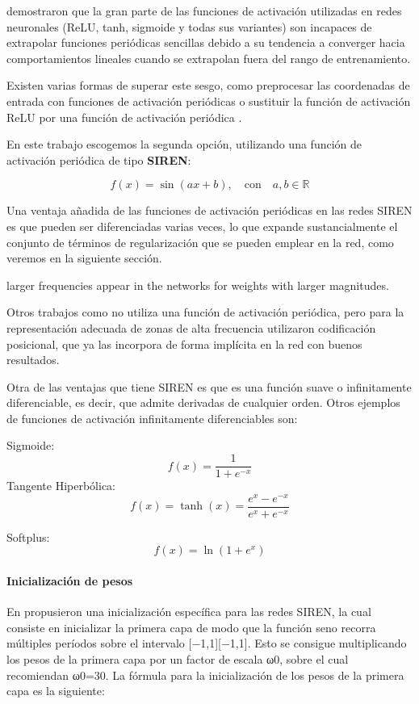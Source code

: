 \cite{ziyin2020neuralnetworksfaillearn} demostraron que la gran parte de las funciones de activación utilizadas en redes neuronales (ReLU, tanh, sigmoide y todas sus variantes)
son incapaces de extrapolar funciones periódicas sencillas debido a su tendencia a converger hacia comportamientos lineales cuando se extrapolan fuera del rango de entrenamiento.

Existen varias formas de superar este sesgo, como preprocesar las coordenadas de entrada con funciones de activación periódicas \cite{mildenhall2020nerfrepresentingscenesneural}
o sustituir la función de activación ReLU por una función de activación periódica \cite{sitzmann2020implicitneuralrepresentationsperiodic}.

En este trabajo escogemos la segunda opción, utilizando una función de activación periódica de tipo \textbf{SIREN}:

\[
f(x) = \sin(ax + b), \quad \text{con} \quad a, b \in \mathbb{R}
\]

Una ventaja añadida de las funciones de activación periódicas en las redes SIREN es que pueden ser diferenciadas varias veces,
lo que expande sustancialmente el conjunto de términos de regularización que se pueden emplear en la red, como veremos en la siguiente sección.

larger frequencies appear in the networks for weights with larger magnitudes.

Otros trabajos como \cite{mildenhall2020nerfrepresentingscenesneural} no utiliza una función de activación periódica, pero para la representación adecuada de zonas de alta frecuencia
utilizaron codificación posicional, que ya las incorpora de forma implícita en la red con buenos resultados.

Otra de las ventajas que tiene SIREN es que es una función suave o infinitamente diferenciable, es decir, que admite derivadas de cualquier orden.
Otros ejemplos de funciones de activación infinitamente diferenciables son:

Sigmoide:
\[
f(x) = \frac{1}{1 + e^{-x}}
\]
Tangente Hiperbólica:
\[
f(x) = \tanh(x) = \frac{e^x - e^{-x}}{e^x + e^{-x}}
\]

Softplus:
\[
f(x) = \ln(1 + e^x)
\]

\paragraph{Inicialización de pesos}

En \cite{sitzmann2020implicitneuralrepresentationsperiodic} propusieron una inicialización específica para las redes SIREN,
la cual consiste en inicializar la primera capa de modo que la función seno recorra múltiples períodos sobre el intervalo [−1,1][−1,1].
Esto se consigue multiplicando los pesos de la primera capa por un factor de escala ω0, sobre el cual recomiendan ω0=30.
La fórmula para la inicialización de los pesos de la primera capa es la siguiente:

